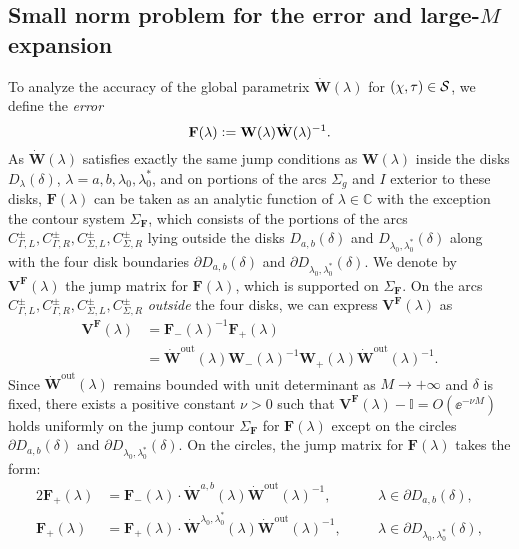 \subsection{Small norm problem for the error and large-$M$ expansion}
To analyze the accuracy of the global parametrix $\dot{\mathbf{W}}(\lambda)$ for $(\chi,\tau)\in \mathcal{S}$, we define the \emph{error}
\begin{equation}
\mathbf{F}(\lambda) \vcentcolon=  \mathbf{W}(\lambda) \dot{\mathbf{W}}(\lambda)^{-1}.
\label{eq:F-bun}
\end{equation} 
As $\dot{\mathbf{W}}(\lambda)$ satisfies exactly the same jump conditions as $\mathbf{W}(\lambda)$ inside the disks $D_\lambda(\delta)$, $\lambda=a,b,\lambda_0,\lambda_0^*$, and on portions of the arcs $\Sigma_g$ and $I$ exterior to these disks, $\mathbf{F}(\lambda)$ can be taken as an analytic function of $\lambda\in\mathbb{C}$ with the exception the contour system $\Sigma_\mathbf{F}$, which consists of the portions of the arcs $C^\pm_{\Gamma, L}, C^\pm_{\Gamma, R}, C^\pm_{\Sigma, L}, C^\pm_{\Sigma, R}$ lying outside the disks $D_{a,b}(\delta)$ and $D_{\lambda_0,\lambda_0^*}(\delta)$ along with the four disk boundaries $\partial D_{a,b}(\delta)$ and $\partial D_{\lambda_0,\lambda_0^*}(\delta)$. We denote by $\mathbf{V}^{\mathbf{F}}(\lambda)$ the jump matrix for $\mathbf{F}(\lambda)$, which is supported on $\Sigma_\mathbf{F}$. On the arcs $C^\pm_{\Gamma, L}, C^\pm_{\Gamma, R}, C^\pm_{\Sigma, L}, C^\pm_{\Sigma, R}$ \emph{outside} the four disks, we can express $\mathbf{V}^{\mathbf{F}}(\lambda)$ as
\begin{equation}
\begin{split}
\mathbf{V}^{\mathbf{F}}(\lambda) &= \mathbf{F}_-(\lambda)^{-1}\mathbf{F}_+ (\lambda)\\
&=\dot{\mathbf{W}}^\mathrm{out}(\lambda)\mathbf{W}_-(\lambda)^{-1}\mathbf{W}_+ (\lambda)\dot{\mathbf{W}}^\mathrm{out}(\lambda)^{-1}.
\end{split}
\end{equation}
Since $\dot{\mathbf{W}}^\mathrm{out}(\lambda)$ remains bounded with unit determinant as $M\to+\infty$ and $\delta$ is fixed, there exists a positive constant $\nu>0$ such that $\mathbf{V}^\mathbf{F}(\lambda) - \mathbb{I} = O(\ee^{-\nu M})$ holds uniformly on the jump contour $\Sigma_\mathbf{F}$ for $\mathbf{F}(\lambda)$ except on the circles $\partial D_{a,b}(\delta)$ and $\partial D_{\lambda_0,\lambda_0^*}(\delta)$. On the circles, the jump matrix for $\mathbf{F}(\lambda)$ takes the form:
\begin{alignat}{2}
 \mathbf{F}_+(\lambda) &= \mathbf{F}_-(\lambda) \cdot \dot{\mathbf{W}}^{a,b}(\lambda)\dot{\mathbf{W}}^\mathrm{out}(\lambda)^{-1},&&\quad \lambda \in \partial D_{a,b}(\delta),\label{eq:F-jump-bun-a-b}\\
  \mathbf{F}_+(\lambda) &= \mathbf{F}_+(\lambda) \cdot \dot{\mathbf{W}}^{\lambda_0,\lambda_0^*}(\lambda)\dot{\mathbf{W}}^\mathrm{out}(\lambda)^{-1},&&\quad \lambda \in \partial D_{\lambda_0,\lambda_0^*}(\delta),
  \label{eq:F-jump-bun-lambda0}
\end{alignat}
